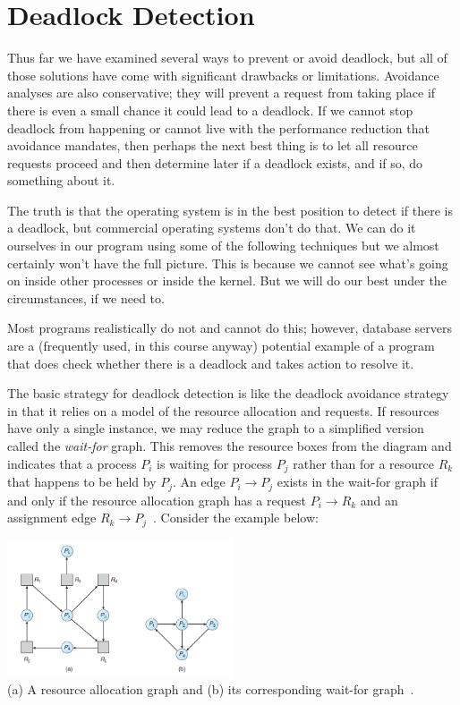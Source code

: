 




\section*{Deadlock Detection}
Thus far we have examined several ways to prevent or avoid deadlock, but all of those solutions have come with significant drawbacks or limitations. Avoidance analyses are also conservative; they will prevent a request from taking place if there is even a small chance it could lead to a deadlock. If we cannot stop deadlock from happening or cannot live with the performance reduction that avoidance mandates, then perhaps the next best thing is to let all resource requests proceed and then determine later if a deadlock exists, and if so, do something about it.

The truth is that the operating system is in the best position to detect if there is a deadlock, but commercial operating systems don't do that. We can do it ourselves in our program using some of the following techniques but we almost certainly won't have the full picture. This is because we cannot see what's going on inside other processes or inside the kernel. But we will do our best under the circumstances, if we need to.

Most programs realistically do not and cannot do this; however, database servers are a (frequently used, in this course anyway) potential example of a program that does check whether there is a deadlock and takes action to resolve it.

The basic strategy for deadlock detection is like the deadlock avoidance strategy in that it relies on a model of the resource allocation and requests. If resources have only a single instance, we may reduce the graph to a simplified version called the \textit{wait-for} graph. This removes the resource boxes from the diagram and indicates that a process $P_{i}$ is waiting for process $P_{j}$ rather than for a resource $R_{k}$ that happens to be held by $P_{j}$. An edge $P_{i} \rightarrow P_{j}$ exists in the wait-for graph if and only if the resource allocation graph has a request $P_{i} \rightarrow R_{k}$ and an assignment edge $R_{k} \rightarrow P_{j}$~\cite{osc}. Consider the example below:

\begin{center}
	\includegraphics[width=0.5\textwidth]{images/rag-waitfor.png}\\
	(a) A resource allocation graph and (b) its corresponding wait-for graph~\cite{osc}.
\end{center}

